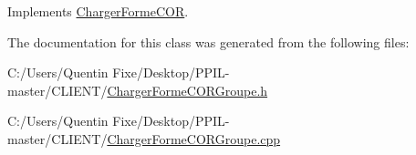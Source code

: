 Implements \hyperlink{class_charger_forme_c_o_r_a1d9563c3a1ff9d6d86aa87a83bdaf8da}{Charger\+Forme\+C\+OR}.



The documentation for this class was generated from the following files\+:\begin{DoxyCompactItemize}
\item 
C\+:/\+Users/\+Quentin Fixe/\+Desktop/\+P\+P\+I\+L-\/master/\+C\+L\+I\+E\+N\+T/\hyperlink{_charger_forme_c_o_r_groupe_8h}{Charger\+Forme\+C\+O\+R\+Groupe.\+h}\item 
C\+:/\+Users/\+Quentin Fixe/\+Desktop/\+P\+P\+I\+L-\/master/\+C\+L\+I\+E\+N\+T/\hyperlink{_charger_forme_c_o_r_groupe_8cpp}{Charger\+Forme\+C\+O\+R\+Groupe.\+cpp}\end{DoxyCompactItemize}
